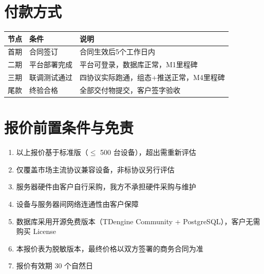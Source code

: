 \documentclass[12pt,a4paper]{ctexart}
\begin{document}
\section{付款方式}

\begin{table}[H]\centering
\begin{tabular}{p{1.2cm}p{5cm}p{6cm}}
\toprule\textbf{节点} & \textbf{条件} & \textbf{说明} \\
\midrule
首期 & 合同签订 & 合同生效后5个工作日内 \\
二期 & 平台部署完成 & 平台可登录，数据库正常，M1里程碑 \\
三期 & 联调测试通过 & 四协议实际跑通，组态+推送正常，M4里程碑 \\
尾款 & 终验合格 & 全部交付物提交，客户签字验收 \\
\bottomrule
\end{tabular}
\end{table}

\section{报价前置条件与免责}

\begin{enumerate}[leftmargin=*]
  \item 以上报价基于标准版（$\leq$ 500 台设备），超出需重新评估
  \item 仅覆盖市场主流协议兼容设备，非标协议另行评估
  \item 服务器硬件由客户自行采购，我方不承担硬件采购与维护
  \item 设备与服务器间网络连通性由客户保障
  \item 数据库采用开源免费版本（TDengine Community + PostgreSQL），客户无需购买 License
  \item 本报价表为脱敏版本，最终价格以双方签署的商务合同为准
  \item 报价有效期 30 个自然日
\end{enumerate}
\end{document}
